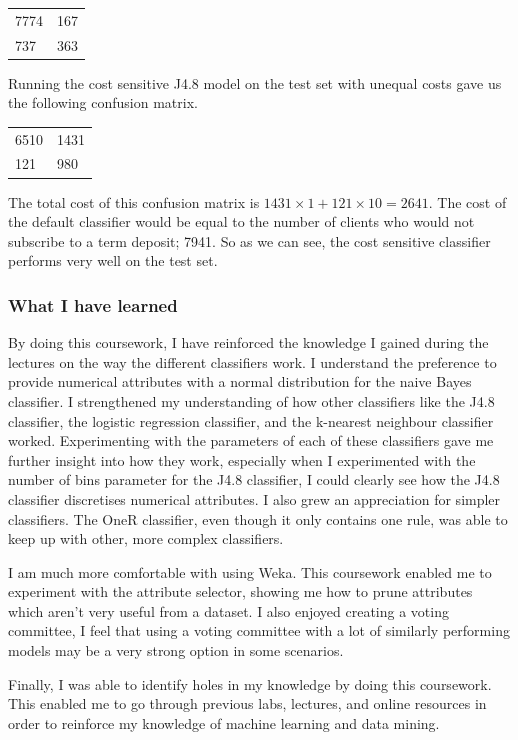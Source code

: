 \documentclass[a4paper,11pt]{article}
\begin{document}
\begin{table}[H]
  \begin{center}
    \begin{tabular}{l l }
      7774 & 167 \\
      737 & 363 \\
    \end{tabular}
  \end{center}
  \label{tab:J48EqualTestCost}
\end{table}

Running the cost sensitive J4.8 model on the test set with unequal costs gave us the following confusion matrix.

\begin{table}[H]
  \begin{center}
    \begin{tabular}{l l }
      6510 & 1431 \\
      121 & 980 \\
    \end{tabular}
  \end{center}
  \label{tab:J48UnequalTestCost}
\end{table}

The total cost of this confusion matrix is $ 1431 \times 1 + 121 \times 10 = 2641 $. The cost of the default classifier
would be equal to the number of clients who would not subscribe to a term deposit; 7941. So as we can see, the cost
sensitive classifier performs very well on the test set. 

\subsubsection{What I have learned}
By doing this coursework, I have reinforced the knowledge I gained during the lectures on the way the different classifiers
work. I understand the preference to provide numerical attributes with a normal distribution for the naive Bayes classifier.
I strengthened my understanding of how other classifiers like the J4.8 classifier, the logistic regression classifier, and the
k-nearest neighbour classifier worked. Experimenting with the parameters of each of these classifiers gave me further insight
into how they work, especially when I experimented with the number of bins parameter for the J4.8 classifier, I could clearly
see how the J4.8 classifier discretises numerical attributes. I also grew an appreciation for simpler classifiers. The OneR
classifier, even though it only contains one rule, was able to keep up with other, more complex classifiers.

I am much more comfortable with using Weka. This coursework enabled me to experiment with the attribute selector, showing me
how to prune attributes which aren't very useful from a dataset. I also enjoyed creating a voting committee, I feel that
using a voting committee with a lot of similarly performing models may be a very strong option in some scenarios.

Finally, I was able to identify holes in my knowledge by doing this coursework. This enabled me to go through previous labs,
lectures, and online resources in order to reinforce my knowledge of machine learning and data mining.
\end{document}
